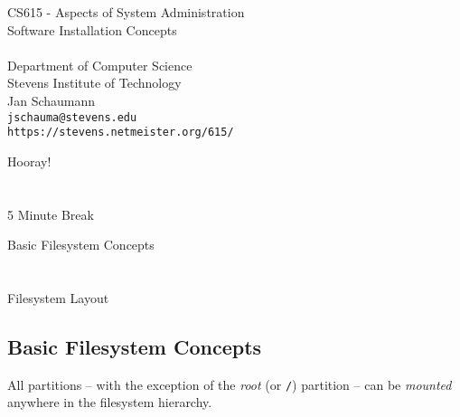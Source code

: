 \documentclass[xga]{xdvislides}
\begin{document}
\setfontphv

\lhead{\slidetitle}                               %
\cfoot{\relax}                               %
\rfoot{\Gray{\today}}

\vspace*{\fill}
\begin{center}
	\Hugesize
		CS615 - Aspects of System Administration\\ [1em]
		Software Installation Concepts \\ [1em]
	\hspace*{5mm}\blueline\\ [1em]
	\Normalsize
		Department of Computer Science\\
		Stevens Institute of Technology\\
		Jan Schaumann\\
		\verb+jschauma@stevens.edu+ \\
		\verb+https://stevens.netmeister.org/615/+
\end{center}
\vspace*{\fill}

\newpage
\vspace*{\fill}
\begin{center}
    \Hugesize
        Hooray! \\ [1em]
    \hspace*{5mm}
    \blueline\\
    \hspace*{5mm}\\
        5 Minute Break
\end{center}
\vspace*{\fill}

\newpage
\vspace*{\fill}
\begin{center}
	\Hugesize
		Basic Filesystem Concepts\\ [1em]
	\hspace*{5mm}
	\blueline\\
	\hspace*{5mm}\\
		Filesystem Layout
\end{center}
\vspace*{\fill}

\subsection{Basic Filesystem Concepts}
All partitions -- with the exception of the {\em root} (or \verb+/+) partition
-- can be {\em mounted} anywhere in the filesystem hierarchy.
\\
\end{document}
